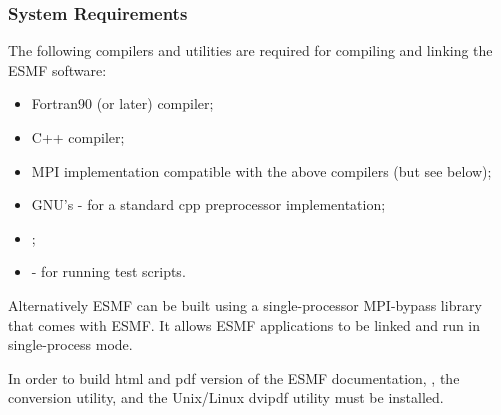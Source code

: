 
\subsubsection{System Requirements}
\label{sec:systemreq}

The following compilers and utilities are required for compiling and 
linking the ESMF software:
\begin{itemize}
\item Fortran90 (or later) compiler;
\item C++ compiler;
\item MPI implementation compatible with the above compilers (but see below);
\item GNU's  -
for a standard cpp preprocessor implementation;
\item {}; 
\item {} - for running
test scripts.
\end{itemize} 

Alternatively ESMF can be built using a single-processor MPI-bypass library
that comes with ESMF. It allows ESMF applications to be linked and run in
single-process mode.

In order to build html and pdf version of the ESMF documentation, 
, the  conversion utility, and the Unix/Linux dvipdf utility must be installed.
